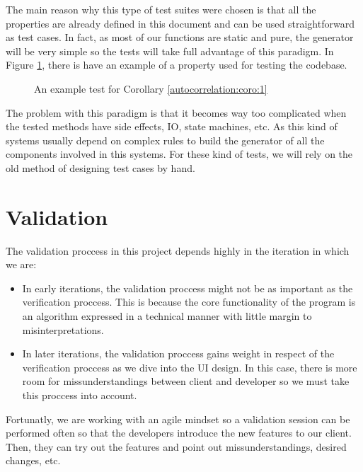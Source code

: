     The main reason why this type of test suites were chosen is that all the
    properties are already defined in this document and can be used
    straightforward as test cases. In fact, as most of our functions
    are static and pure, the generator will be very simple so the
    tests will take full advantage of this paradigm. In Figure \ref{test_example},
    there is have an example of a property used for testing the codebase.\\

    \begin{figure}[ht!]
      \caption{An example test for Corollary \ref{autocorrelation:coro:1}}
      \label{test_example}
    \end{figure}

    The problem with this paradigm is that it becomes way too complicated when
    the tested methods have side effects, IO, state machines, etc. As this
    kind of systems usually depend on complex rules to build the generator of
    all the components involved in this systems. For these kind of tests, we
    will rely on the old method of designing test cases by hand.\\

\section{Validation}

The validation proccess in this project depends highly in the iteration in which
we are:

\begin{itemize}
  \item In early iterations, the validation proccess might not be as important
  as the verification proccess. This is because the core functionality of the
  program is an algorithm expressed in a technical manner with little margin
  to misinterpretations.
  \item In later iterations, the validation proccess gains weight in respect of
  the verification proccess as we dive into the UI design. In this case, there
  is more room for missunderstandings between client and developer so we must
  take this proccess into account.
\end{itemize}

Fortunatly, we are working with an agile mindset so a validation
session can be performed often so that the developers introduce the new features to
our client. Then, they can try out the features and point out missunderstandings,
desired changes, etc.\\
